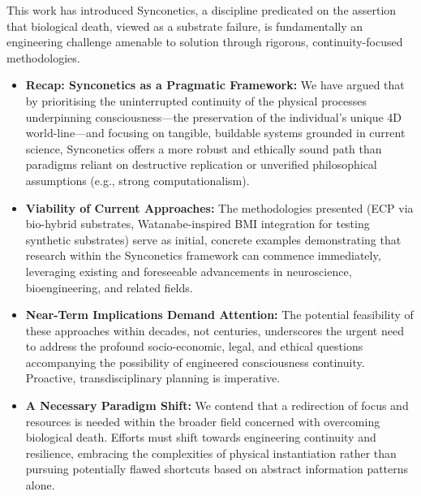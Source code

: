 \documentclass[10pt]{article}
\begin{document}
\begin{sloppypar}
  This work has introduced Synconetics, a discipline predicated on the assertion that biological death, viewed as a substrate failure, is fundamentally an engineering challenge amenable to solution through rigorous, continuity-focused methodologies.

  \begin{itemize}
    \item \textbf{Recap: Synconetics as a Pragmatic Framework:} We have argued that by prioritising the uninterrupted continuity of the physical processes underpinning consciousness—the preservation of the individual's unique 4D world-line—and focusing on tangible, buildable systems grounded in current science, Synconetics offers a more robust and ethically sound path than paradigms reliant on destructive replication or unverified philosophical assumptions (e.g., strong computationalism).
    \item \textbf{Viability of Current Approaches:} The methodologies presented (ECP via bio-hybrid substrates, Watanabe-inspired BMI integration for testing synthetic substrates) serve as initial, concrete examples demonstrating that research within the Synconetics framework can commence immediately, leveraging existing and foreseeable advancements in neuroscience, bioengineering, and related fields.
    \item \textbf{Near-Term Implications Demand Attention:} The potential feasibility of these approaches within decades, not centuries, underscores the urgent need to address the profound socio-economic, legal, and ethical questions accompanying the possibility of engineered consciousness continuity. Proactive, transdisciplinary planning is imperative.
    \item \textbf{A Necessary Paradigm Shift:} We contend that a redirection of focus and resources is needed within the broader field concerned with overcoming biological death. Efforts must shift towards engineering continuity and resilience, embracing the complexities of physical instantiation rather than pursuing potentially flawed shortcuts based on abstract information patterns alone.


\end{itemize}
\end{sloppypar}
\end{document}
